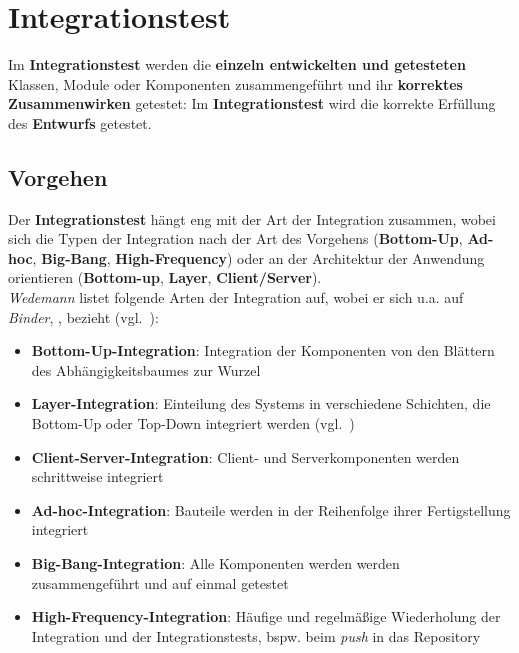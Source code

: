 \section{Integrationstest}
\begin{tcolorbox}[title=Integrationstest]
    Im \textbf{Integrationstest} werden die \textbf{einzeln entwickelten und getesteten} Klassen, Module oder Komponenten zusammengeführt und ihr \textbf{korrektes Zusammenwirken} getestet:
    Im \textbf{Integrationstest} wird die korrekte Erfüllung des \textbf{Entwurfs} getestet.
\end{tcolorbox}

\subsection{Vorgehen}
Der \textbf{Integrationstest} hängt eng mit der Art der Integration zusammen, wobei sich die Typen der Integration nach der Art des Vorgehens (\textbf{Bottom-Up}, \textbf{Ad-hoc}, \textbf{Big-Bang}, \textbf{High-Frequency}) oder an der Architektur der Anwendung orientieren (\textbf{Bottom-up}, \textbf{Layer}, \textbf{Client/Server}).\\

\noindent
\textit{Wedemann} listet folgende Arten der Integration auf, wobei er sich u.a. auf \textit{Binder}, \cite{Bin99}, bezieht (vgl.~\cite[59]{Wed09c}):

\begin{itemize}
    \item \textbf{Bottom-Up-Integration}: Integration der Komponenten von den Blättern des Abhängigkeitsbaumes zur Wurzel
    \item \textbf{Layer-Integration}: Einteilung des Systems in verschiedene Schichten, die Bottom-Up oder Top-Down integriert werden (vgl.~\cite[688]{Bin99})
    \item \textbf{Client-Server-Integration}: Client- und Serverkomponenten werden schrittweise integriert
    \item \textbf{Ad-hoc-Integration}: Bauteile werden in der Reihenfolge ihrer Fertigstellung integriert
    \item \textbf{Big-Bang-Integration}: Alle Komponenten werden werden zusammengeführt und auf einmal getestet
    \item \textbf{High-Frequency-Integration}: Häufige und regelmäßige Wiederholung der Integration und der Integrationstests, bspw. beim \textit{push} in das Repository
\end{itemize}

